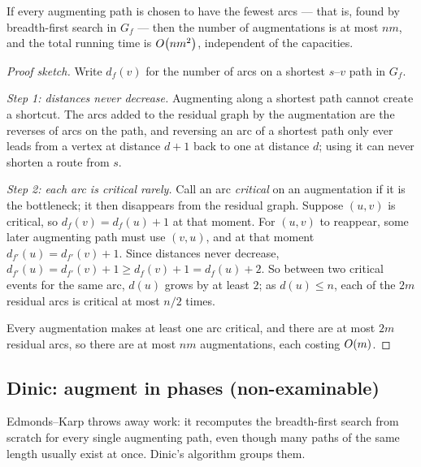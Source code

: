 \begin{theorem}\label{thm:flow-ek}
If every augmenting path is chosen to have the fewest arcs --- that is, found
by breadth-first search in $G_f$ --- then the number of augmentations is at
most $nm$, and the total running time is $O\!\left(nm^2\right)$, independent of the
capacities.
\end{theorem}

\begin{proof}[Proof sketch]
Write $d_f(v)$ for the number of arcs on a shortest $s$--$v$ path in $G_f$.

\emph{Step 1: distances never decrease.} Augmenting along a shortest path
cannot create a shortcut. The arcs added to the residual graph by the
augmentation are the reverses of arcs on the path, and reversing an arc of a
shortest path only ever leads from a vertex at distance $d+1$ back to one at
distance $d$; using it can never shorten a route from $s$.

\emph{Step 2: each arc is critical rarely.} Call an arc \emph{critical} on an
augmentation if it is the bottleneck; it then disappears from the residual
graph. Suppose $(u,v)$ is critical, so $d_f(v) = d_f(u) + 1$ at that moment.
For $(u,v)$ to reappear, some later augmenting path must use $(v,u)$, and at
that moment $d_{f'}(u) = d_{f'}(v) + 1$. Since distances never decrease,
$d_{f'}(u) = d_{f'}(v) + 1 \ge d_f(v) + 1 = d_f(u) + 2$. So between two
critical events for the same arc, $d(u)$ grows by at least $2$; as
$d(u) \le n$, each of the $2m$ residual arcs is critical at most $n/2$ times.

Every augmentation makes at least one arc critical, and there are at most $2m$
residual arcs, so there are at most $nm$ augmentations, each costing
$O\!\left(m\right)$.
\end{proof}

\subsection{Dinic: augment in phases (non-examinable)}

Edmonds--Karp throws away work: it recomputes the breadth-first search from
scratch for every single augmenting path, even though many paths of the same
length usually exist at once. Dinic's algorithm groups them.

